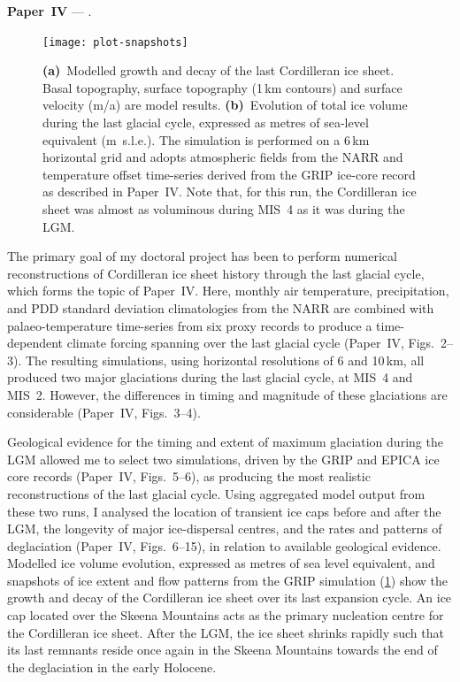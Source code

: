 \documentclass[a4paper]{kappa}
\newcommand{\CCYC}[0]{Paper~IV}     %
\begin{document}
\noindent\textbf{\CCYC} --- .
\bigskip

\begin{figure}
  \texttt{[image: plot-snapshots]}
  \caption{\textbf{(a)}~Modelled growth and decay of the last Cordilleran ice
           sheet. Basal topography, surface topography (1\,km contours) and
           surface velocity (m/a) are model results.
           \textbf{(b)}~Evolution of total ice volume during the last glacial
           cycle, expressed as metres of sea-level equivalent (m~s.l.e.). The
           simulation is performed on a 6\,km horizontal grid and adopts
           atmospheric fields from the NARR \citep{Mesinger.etal.2006} and
           temperature offset time-series derived from the GRIP ice-core record
           \citep{Dansgaard.etal.1993} as described in \CCYC. Note that, for
           this run, the Cordilleran ice sheet was almost as voluminous during
           MIS~4 as it was during the LGM.}
  \label{fig:plot-snapshots}
\end{figure}

The primary goal of my doctoral project has been to perform numerical
reconstructions
of Cordilleran ice sheet history through the last glacial cycle, which forms
the topic of \CCYC.
Here, monthly air temperature, precipitation, and PDD standard deviation
climatologies from the NARR are combined with palaeo-temperature time-series
from six proxy records to produce a time-dependent climate forcing
spanning over the last glacial cycle (\CCYC,
Figs.~2--3). The resulting simulations, using horizontal resolutions of 6 and
10\,km, all produced two major glaciations during the last glacial cycle, at
MIS~4 and MIS~2. However, the differences in timing and magnitude of these
glaciations are considerable (\CCYC, Figs.~3--4).

Geological evidence for the timing and extent of maximum glaciation during the
LGM allowed me to select two simulations, driven by the GRIP
\citep{Dansgaard.etal.1993} and EPICA \citep{Jouzel.etal.2007} ice core records
(\CCYC, Figs.~5--6), as producing the most realistic reconstructions of the
last glacial cycle. Using aggregated model output from these two runs, I
analysed the location of transient ice caps before and after the LGM, the
longevity of major ice-dispersal centres, and the rates and patterns of
deglaciation (\CCYC, Figs.~6--15), in relation to available geological
evidence. Modelled ice volume evolution, expressed as metres of sea level
equivalent, and snapshots of ice extent and flow patterns from the GRIP
simulation (\cref{fig:plot-snapshots}) show the growth and decay of the
Cordilleran ice sheet over its last expansion cycle. An ice cap located over
the Skeena Mountains acts as the primary nucleation centre for the Cordilleran
ice sheet. After the LGM, the ice sheet shrinks rapidly such that its last
remnants reside once again in the Skeena Mountains towards the end of the
deglaciation in the early Holocene.
\end{document}

